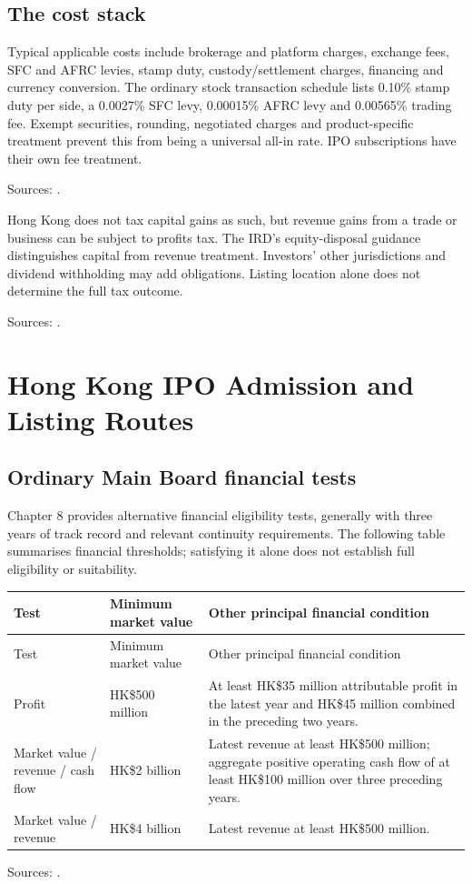 \documentclass[11pt,a4paper]{article}
\newcommand{\source}[1]{\par{\footnotesize\color{ink}Sources: \cite{#1}.}\par}
\begin{document}
\subsection{The cost stack}
Typical applicable costs include brokerage and platform charges, exchange fees, SFC and AFRC levies, stamp duty, custody/settlement charges, financing and currency conversion. The ordinary stock transaction schedule lists 0.10\% stamp duty per side, a 0.0027\% SFC levy, 0.00015\% AFRC levy and 0.00565\% trading fee. Exempt securities, rounding, negotiated charges and product-specific treatment prevent this from being a universal all-in rate. IPO subscriptions have their own fee treatment.\source{fees}

Hong Kong does not tax capital gains as such, but revenue gains from a trade or business can be subject to profits tax. The IRD's equity-disposal guidance distinguishes capital from revenue treatment. Investors' other jurisdictions and dividend withholding may add obligations. Listing location alone does not determine the full tax outcome.\source{taxoverview}

\section{Hong Kong IPO Admission and Listing Routes}
\subsection{Ordinary Main Board financial tests}
Chapter 8 provides alternative financial eligibility tests, generally with three years of track record and relevant continuity requirements. The following table summarises financial thresholds; satisfying it alone does not establish full eligibility or suitability.
\begin{longtable}{@{}L{4.0cm}L{3.3cm}L{8.2cm}@{}}
\toprule Test & Minimum market value & Other principal financial condition\\\midrule\endfirsthead
\toprule Test & Minimum market value & Other principal financial condition\\\midrule\endhead
Profit & HK\$500 million & At least HK\$35 million attributable profit in the latest year and HK\$45 million combined in the preceding two years.\\
Market value / revenue / cash flow & HK\$2 billion & Latest revenue at least HK\$500 million; aggregate positive operating cash flow of at least HK\$100 million over three preceding years.\\
Market value / revenue & HK\$4 billion & Latest revenue at least HK\$500 million.\\
\bottomrule
\end{longtable}
\source{eligibility}
\end{document}
